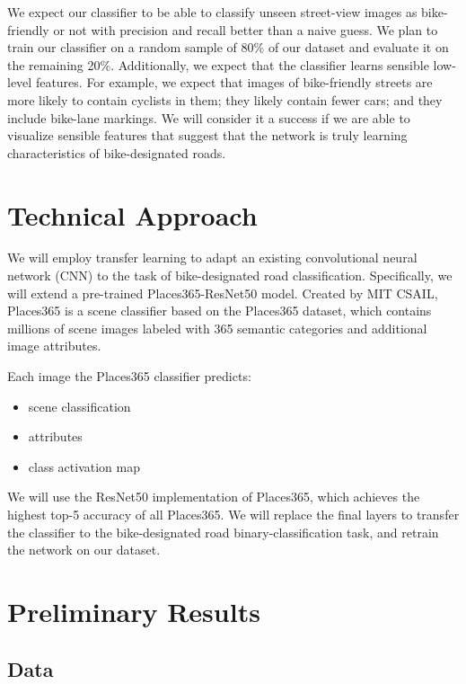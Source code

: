 \documentclass[10pt,twocolumn,letterpaper]{article}
\begin{document}
We expect our classifier to be able to classify unseen street-view images as bike-friendly or not with precision and recall better than a naive guess. We plan to train our classifier on a random sample of 80\% of our dataset and evaluate it on the remaining 20\%. Additionally, we expect that the classifier learns sensible low-level features. For example, we expect that images of bike-friendly streets are more likely to contain cyclists in them; they likely contain fewer cars; and they include bike-lane markings. We will consider it a success if we are able to visualize sensible features that suggest that the network is truly learning characteristics of bike-designated roads.

\section{Technical Approach}

We will employ transfer learning to adapt an existing convolutional neural network (CNN) to the task of bike-designated road classification. Specifically, we will extend a pre-trained Places365-ResNet50 model. Created by MIT CSAIL, Places365 is a scene classifier based on the Places365 dataset, which contains millions of scene images labeled with 365 semantic categories and additional image attributes. 

Each image the Places365 classifier predicts: 

\begin{itemize}
	\itemsep0em 
	\item scene classification 
	\item attributes
	\item class activation map
\end{itemize}

We will use the ResNet50 implementation of Places365, which achieves the highest top-5 accuracy of all Places365. We will replace the final layers to transfer the classifier to the bike-designated road binary-classification task, and retrain the network on our dataset.

\section{Preliminary Results}

\subsection{Data}
\end{document}
